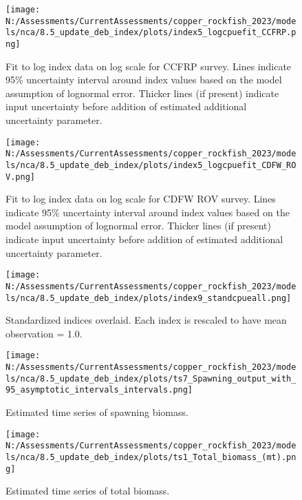 \documentclass[11pt,
  english,
  letterpaper,
]{article}
\begin{document}
\begin{figure}
\centering
\texttt{[image: N:/Assessments/CurrentAssessments/copper\_rockfish\_2023/models/nca/8.5\_update\_deb\_index/plots/index5\_logcpuefit\_CCFRP.png]}
\caption{Fit to log index data on log scale for CCFRP survey. Lines indicate 95\% uncertainty interval around index values based on the model assumption of lognormal error. Thicker lines (if present) indicate input uncertainty before addition of estimated additional uncertainty parameter.\label{fig:ccfrp-index-fit}}
\end{figure}

\begin{figure}
\centering
\texttt{[image: N:/Assessments/CurrentAssessments/copper\_rockfish\_2023/models/nca/8.5\_update\_deb\_index/plots/index5\_logcpuefit\_CDFW\_ROV.png]}
\caption{Fit to log index data on log scale for CDFW ROV survey. Lines indicate 95\% uncertainty interval around index values based on the model assumption of lognormal error. Thicker lines (if present) indicate input uncertainty before addition of estimated additional uncertainty parameter.\label{fig:rov-index-fit}}
\end{figure}

\begin{figure}
\centering
\texttt{[image: N:/Assessments/CurrentAssessments/copper\_rockfish\_2023/models/nca/8.5\_update\_deb\_index/plots/index9\_standcpueall.png]}
\caption{Standardized indices overlaid. Each index is rescaled to have mean observation = 1.0.\label{fig:standardized-indices}}
\end{figure}

\begin{figure}
\centering
\texttt{[image: N:/Assessments/CurrentAssessments/copper\_rockfish\_2023/models/nca/8.5\_update\_deb\_index/plots/ts7\_Spawning\_output\_with\_95\_asymptotic\_intervals\_intervals.png]}
\caption{Estimated time series of spawning biomass.\label{fig:ssb}}
\end{figure}

\begin{figure}
\centering
\texttt{[image: N:/Assessments/CurrentAssessments/copper\_rockfish\_2023/models/nca/8.5\_update\_deb\_index/plots/ts1\_Total\_biomass\_(mt).png]}
\caption{Estimated time series of total biomass.\label{fig:tot-bio}}
\end{figure}
\end{document}

